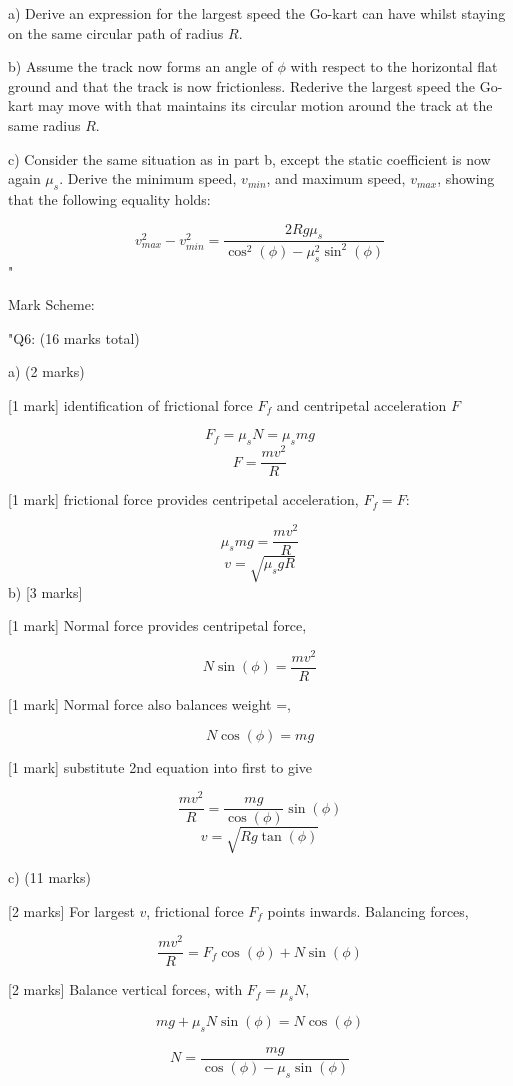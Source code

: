 a) Derive an expression for the largest speed the Go-kart can have whilst staying on the same circular path of radius \( R \). 
    
b) Assume the track now forms an angle of \( \phi \) with respect to the horizontal flat ground and that the track is now frictionless. Rederive the largest speed the Go-kart may move with that maintains its circular motion around the track at the same radius \( R \). 
    
c) Consider the same situation as in part b, except the static coefficient is now again \( \mu_{s} \). Derive the minimum speed, \( v_{min} \), and maximum speed, \( v_{max} \), showing that the following equality holds:
    
\[ 
v_{max}^{2} - v_{min}^{2} = \frac{2Rg\mu_{s}}{\cos^{2}(\phi) - \mu_{s}^{2}\sin^{2}(\phi)}
\]"

Mark Scheme:

"{Q6: (16 marks total)}

a) (2 marks)

[1 mark] identification of frictional force \( F_f \) and centripetal acceleration \( F \)

\[ F_f = \mu_s N = \mu_s mg \]
\[ F = \frac{m v^2}{R} \]

[1 mark] frictional force provides centripetal acceleration, \(F_f = F \):

\[ \mu_s mg = \frac{m v^2}{R} \]
\[ v = \sqrt{\mu_s g R} \]
b) [3 marks]

[1 mark] Normal force provides centripetal force,

\[ N \sin(\phi) = \frac{m v^2}{R} \]

[1 mark] Normal force also balances weight =, 

\[ N \cos(\phi) = mg \]

[1 mark] substitute 2nd equation into first to give 

\[ \frac{m v^2}{R} = \frac{mg}{\cos(\phi)} \sin(\phi) \]
\[ v = \sqrt{R g \tan(\phi)} \]

c) (11 marks)

[2 marks] For largest \( v \), frictional force \( F_f \) points inwards. Balancing forces, 

\[ \frac{m v^2}{R} = F_f \cos(\phi) + N \sin(\phi) \]

[2 marks] Balance vertical forces, with \( F_f = \mu_s N \),

\[ mg + \mu_s N \sin(\phi) = N \cos(\phi) \]

\[ N = \frac{mg}{\cos(\phi) - \mu_s \sin(\phi)} \]

